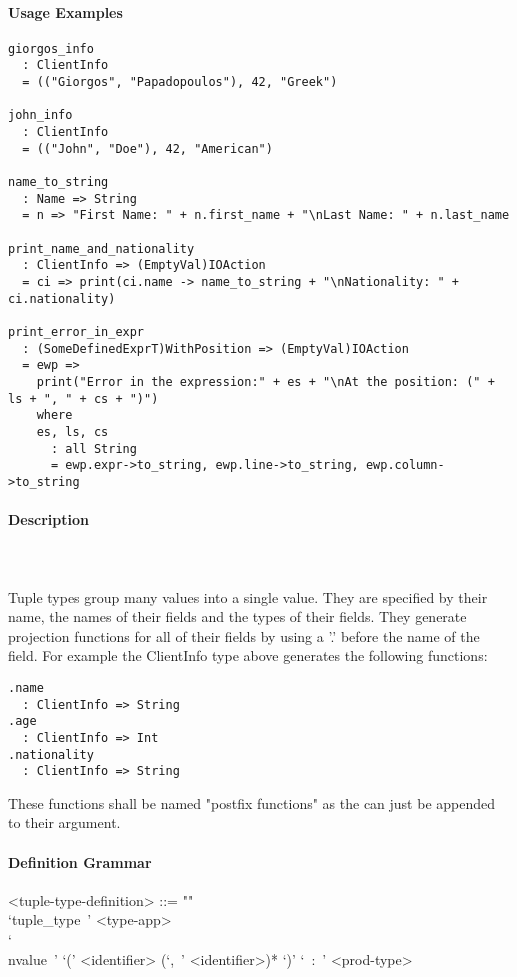 \documentclass{article}
\def\pend{\mbox{} \\\\}
\begin{document}
\paragraph{Usage Examples}

\begin{verbatim}
giorgos_info
  : ClientInfo
  = (("Giorgos", "Papadopoulos"), 42, "Greek")

john_info
  : ClientInfo
  = (("John", "Doe"), 42, "American")

name_to_string
  : Name => String
  = n => "First Name: " + n.first_name + "\nLast Name: " + n.last_name

print_name_and_nationality
  : ClientInfo => (EmptyVal)IOAction
  = ci => print(ci.name -> name_to_string + "\nNationality: " + ci.nationality)

print_error_in_expr
  : (SomeDefinedExprT)WithPosition => (EmptyVal)IOAction
  = ewp =>
    print("Error in the expression:" + es + "\nAt the position: (" + ls + ", " + cs + ")")
    where
    es, ls, cs
      : all String
      = ewp.expr->to_string, ewp.line->to_string, ewp.column->to_string
\end{verbatim}

\paragraph{Description}\pend
Tuple types group many values into a single value. They are specified by their name,
the names of their fields and the types of their fields. They generate 
projection functions for all of their fields by using a '.' before the name of 
the field. For example the ClientInfo type above generates the following 
functions:
\begin{verbatim}
.name
  : ClientInfo => String
.age
  : ClientInfo => Int
.nationality
  : ClientInfo => String
\end{verbatim}
These functions shall be named "postfix functions" as the can just be appended to
their argument.

\paragraph{Definition Grammar}
\begin{grammar}
<tuple-type-definition> ::= ""\\
`tuple_type\ ' <type-app>
\\`\\nvalue\ ' `(' <identifier> (`,\ ' <identifier>)* `)' `\ :\ ' <prod-type>
\end{grammar}
\end{document}
